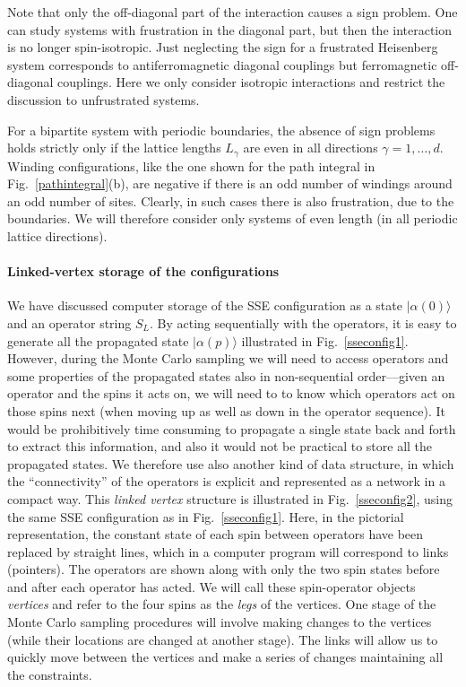 \documentclass[draft,numberedheadings]{aipproc}
\begin{document}
Note that only the off-diagonal part of the interaction causes a sign problem. One can study systems with frustration in the diagonal part, but then the 
interaction is no longer spin-isotropic. Just neglecting the sign for a frustrated Heisenberg system corresponds to antiferromagnetic diagonal couplings but 
ferromagnetic off-diagonal couplings. Here we only consider isotropic interactions and restrict the discussion to unfrustrated systems.

For a bipartite system with periodic boundaries, the absence of sign problems holds strictly only if the lattice lengths $L_\gamma$ are even in all directions 
$\gamma=1,\ldots,d$. Winding configurations, like the one shown for the path integral in Fig.~\ref{pathintegral}(b), are negative if there is an odd number 
of windings around an odd number of sites. Clearly, in such cases there is also frustration, due to the boundaries. We will therefore consider only systems of 
even length (in all periodic lattice directions).

\paragraph{Linked-vertex storage of the configurations}

We have discussed computer storage of the  SSE configuration as a state $|\alpha(0)\rangle$ and an operator string $S_L$. By acting sequentially with the 
operators, it is easy to generate all the propagated state $|\alpha(p)\rangle$ illustrated in Fig.~\ref{sseconfig1}. However, during the Monte Carlo sampling 
we will need to access operators and some properties of the propagated states also in non-sequential order---given an operator and the spins it acts on, we will 
need to to know which operators act on those spins next (when moving up as well as down in the operator sequence). It would be prohibitively time consuming to 
propagate a single state back and forth to extract this information, and also it would not be practical to store all the propagated states. We therefore use also 
another kind of data structure, in which the ``connectivity'' of the operators is explicit and represented as a network in a compact way. This {\it linked vertex} 
structure is illustrated in Fig.~\ref{sseconfig2}, using the same SSE configuration as in Fig.~\ref{sseconfig1}. Here, in the pictorial representation, the constant 
state of each spin between operators have been replaced by straight lines, which in a computer program will correspond to links (pointers). The operators are shown 
along with only the two spin states before and after each operator has acted. We will call these spin-operator objects {\it vertices} and refer to the four spins 
as the {\it legs} of the vertices. One stage of the Monte Carlo sampling procedures will involve making changes to the vertices (while their locations are changed
at another stage). The links will allow us to quickly move between the vertices and make a series of changes maintaining all the constraints.
\end{document}
